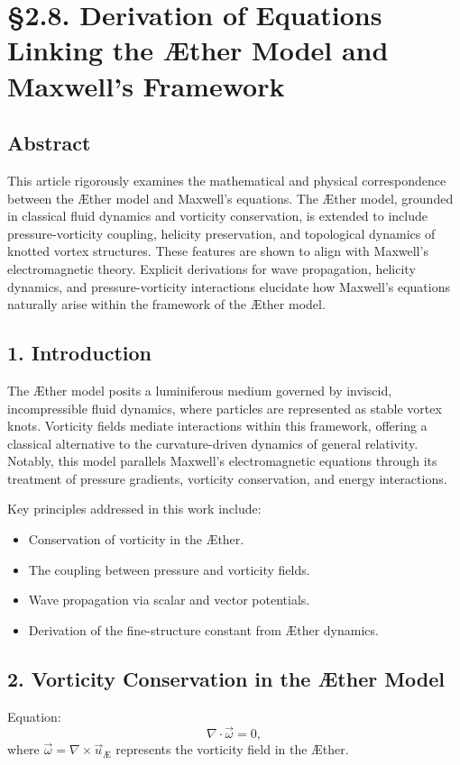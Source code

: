 

        \section*{§2.8. Derivation of Equations Linking the Æther Model and Maxwell's Framework}

        \subsection*{Abstract}
        This article rigorously examines the mathematical and physical correspondence between the Æther model and Maxwell's equations. The Æther model, grounded in classical fluid dynamics and vorticity conservation, is extended to include pressure-vorticity coupling, helicity preservation, and topological dynamics of knotted vortex structures. These features are shown to align with Maxwell's electromagnetic theory. Explicit derivations for wave propagation, helicity dynamics, and pressure-vorticity interactions elucidate how Maxwell's equations naturally arise within the framework of the Æther model.

        \subsection*{1. Introduction}
        The Æther model posits a luminiferous medium governed by inviscid, incompressible fluid dynamics, where particles are represented as stable vortex knots. Vorticity fields mediate interactions within this framework, offering a classical alternative to the curvature-driven dynamics of general relativity. Notably, this model parallels Maxwell's electromagnetic equations through its treatment of pressure gradients, vorticity conservation, and energy interactions.

        Key principles addressed in this work include:
        \begin{itemize}
            \item Conservation of vorticity in the Æther.
            \item The coupling between pressure and vorticity fields.
            \item Wave propagation via scalar and vector potentials.
            \item Derivation of the fine-structure constant from Æther dynamics.
        \end{itemize}

        \subsection*{2. Vorticity Conservation in the Æther Model}
        Equation:
        \begin{equation}
            \nabla \cdot \vec{\omega} = 0,
        \end{equation}
        where $\vec{\omega} = \nabla \times \vec{u}_\text{Æ}$ represents the vorticity field in the Æther.

